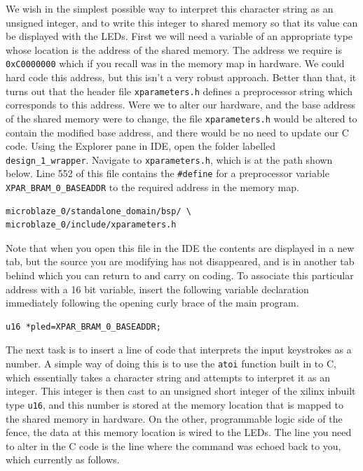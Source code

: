 \documentclass[../physical_computing.tex]{subfiles}
\begin{document}
We wish in the simplest possible way to interpret this character string as an unsigned integer, and to write this
integer to shared memory so that its value can be displayed with the LEDs. First we will need a variable of an 
appropriate type whose location is the address of the shared memory. The address we require is 
\texttt{0xC0000000} which if you recall was in the memory map in hardware. We could hard code this address, 
but this isn't a very robust approach. Better than that, it turns out that the header file \texttt{xparameters.h}
defines a preprocessor string which corresponds to this address. Were we to alter our hardware, and the base
address of the shared memory were to change, the file \texttt{xparameters.h} would be altered to contain the 
modified base address, and there would be no need to update our C code. Using the Explorer pane in IDE, open
the folder labelled \texttt{design\_1\_wrapper}. Navigate to \texttt{xparameters.h}, which is at the path shown
below. Line 552 of this file contains the \texttt{\#define} for a preprocessor variable \texttt{XPAR\_BRAM\_0\_BASEADDR}
to the required address in the memory map.

\begin{verbatim}
microblaze_0/standalone_domain/bsp/ \
microblaze_0/include/xparameters.h
\end{verbatim}

Note that when you open this file in the IDE the contents are displayed in a new tab, but the source you are
modifying has not disappeared, and is in another tab behind which you can return to and carry on coding.
To associate this particular address with a 16 bit variable, insert the following variable declaration
immediately following the opening curly brace of the main program.

\begin{verbatim}
u16 *pled=XPAR_BRAM_0_BASEADDR;
\end{verbatim}

The next task is to insert a line of code that interprets the input keystrokes as a number. A simple way of 
doing this is to use the \texttt{atoi} function built in to C, which essentially takes a character string and
attempts to interpret it as an integer. This integer is then cast to an unsigned short integer of the 
xilinx inbuilt type \texttt{u16}, and this number is stored at the memory location that is mapped to the shared
memory in hardware. On the other, programmable logic side of the fence, the data at this memory location is 
wired to the LEDs. The line you need to alter in the C code is the line where the command was echoed back to you, 
which currently as follows.
\end{document}
